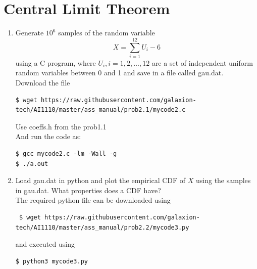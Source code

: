 \documentclass[journal,12pt,twocolumn]{IEEEtran}
\renewcommand\thesection{\arabic{section}}
\begin{document}
\section{Central Limit Theorem}
\begin{enumerate}[label=\thesection.\arabic*.,ref=\thesection.\theenumi]


\item Generate $10^6$ samples of the random variable
    \begin{equation}
        X=\sum_{i=1}^{12} U_i-6        
    \end{equation}
    using a C program, where $U_i, i = 1, 2,\ldots, 12$ are a set of independent uniform random variables between 0 and 1 and save in a file called gau.dat.\\
    
    
    \solution Download the file

    \begin{lstlisting}    
$ wget https://raw.githubusercontent.com/galaxion-tech/AI1110/master/ass_manual/prob2.1/mycode2.c
    \end{lstlisting}

    Use coeffs.h from the prob1.1\\
    And run the code as:

    \begin{lstlisting}
$ gcc mycode2.c -lm -Wall -g
$ ./a.out
\end{lstlisting}

\item Load gau.dat in python and plot the empirical CDF of $X$ using the samples in gau.dat. What properties does a CDF have?\\

\solution 
    The required python file can be downloaded using

    \begin{lstlisting}
 $ wget https://raw.githubusercontent.com/galaxion-tech/AI1110/master/ass_manual/prob2.2/mycode3.py
\end{lstlisting}

and executed using

\begin{lstlisting}
$ python3 mycode3.py
\end{lstlisting}


\end{enumerate}
\end{document}
